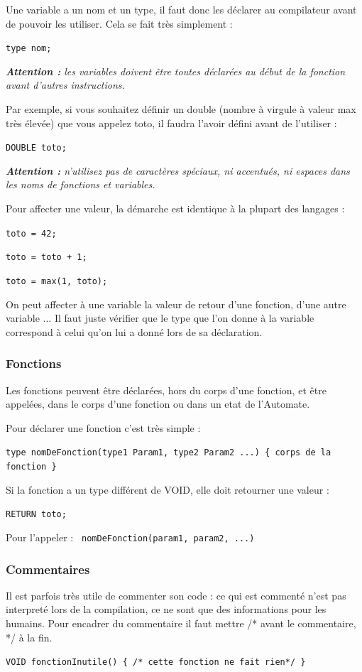 \documentclass[a4paper,11pt]{article}
\begin{document}
Une variable a un nom et un type, il faut donc les déclarer au compilateur avant de pouvoir les utiliser. Cela se fait très simplement : 
\begin{center}
\texttt{type nom;}
\end{center}
\textit{\textbf{Attention :} les variables doivent être toutes déclarées au début de la fonction avant d'autres instructions. } 

Par exemple, si vous souhaitez définir un double (nombre à virgule à valeur max très élevée) que vous appelez toto, il faudra l'avoir défini avant de l'utiliser : 
\begin{center}
\texttt{DOUBLE toto;}
\end{center}
\textit{\textbf{Attention : }n'utilisez pas de caractères spéciaux, ni accentués, ni espaces dans les noms de fonctions et variables.
}

Pour affecter une valeur, la démarche est identique à la plupart des langages :
\begin{center}
	\texttt{toto = 42;}
	
	\texttt{toto = toto + 1;}
	
	\texttt{toto = max(1, toto);}
\end{center}
On peut affecter à une variable la valeur de retour d'une fonction, d'une autre variable ... Il faut juste vérifier que le type que l'on donne à la variable correspond à celui qu'on lui a donné lors de sa déclaration.

\subsubsection{Fonctions}
Les fonctions peuvent être déclarées, hors du corps d'une fonction, et être appelées, dans le corps d'une fonction ou dans un etat de l'Automate.

Pour déclarer une fonction c'est très simple : 
\begin{center}
\texttt{type nomDeFonction(type1 Param1, type2 Param2 ...) \{ corps de la fonction \}}
\end{center}


Si la fonction a un type différent de VOID, elle doit retourner une valeur : 
\begin{center}
\texttt{RETURN toto;}
\end{center}

Pour l'appeler : \texttt{ nomDeFonction(param1, param2, ...)}

\subsubsection{Commentaires}
Il est parfois très utile de commenter son code : ce qui est commenté n'est pas interpreté lors de la compilation, ce ne sont que des informations pour les humains.
Pour encadrer du commentaire il faut mettre /* avant le commentaire, */ à la fin.
\begin{center}
\texttt{VOID fonctionInutile() \{ /* cette fonction ne fait rien*/ \}}
\end{center}
\end{document}
